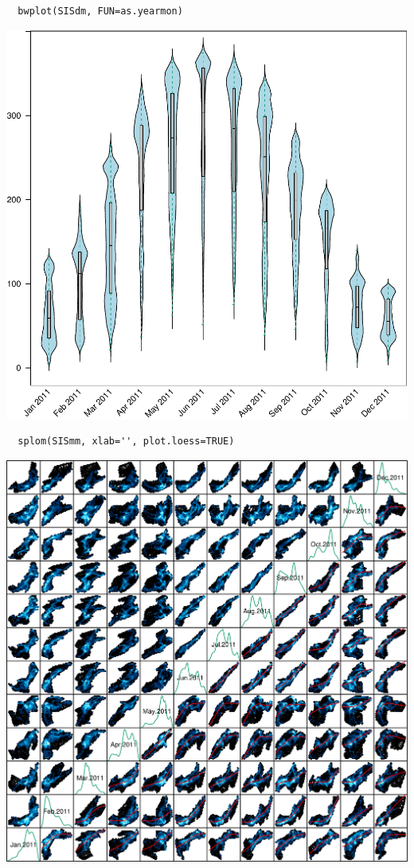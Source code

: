 \documentclass[xcolor={usenames,svgnames,dvipsnames}]{beamer}
\begin{document}
\begin{frame}[fragile,label=sec-4-3-3]{}
 \lstset{language=R,label= ,caption= ,numbers=none}
\begin{lstlisting}
  bwplot(SISdm, FUN=as.yearmon)
\end{lstlisting}

\includegraphics[width=.9\linewidth]{figs/SISdm_boxplot.pdf}
\end{frame}

\begin{frame}[fragile,label=sec-4-3-4]{}
 \lstset{language=R,label= ,caption= ,numbers=none}
\begin{lstlisting}
  splom(SISmm, xlab='', plot.loess=TRUE)
\end{lstlisting}

\includegraphics[width=.9\linewidth]{figs/SISmm_splom.png}
\end{frame}
\end{document}

